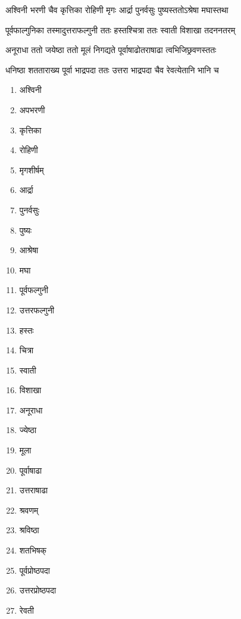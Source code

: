 \label{app:nakshatra_names}

\twolineshloka
{अश्विनी भरणी चैव कृत्तिका रोहिणी मृगः}
{आर्द्रा पुनर्वसुः पुष्यस्ततोऽश्रेषा मघास्तथा}

\twolineshloka
{पूर्वफाल्गुनिका तस्मादुत्तराफल्गुनी ततः}
{हस्तश्चित्रा ततः स्वाती विशाखा तदननतरम्}

\twolineshloka
{अनूराधा ततो जयेष्ठा ततो मूलं निगद्यते}
{पूर्वाषाढोतराषाढा त्वभिजिछ्रवणस्ततः}

\twolineshloka
{धनिष्ठा शतताराख्य पूर्वा भाद्रपदा ततः}
{उत्तरा भाद्रपदा चैव रेवत्येतानि भानि च}


\begin{multicols}{2}
\begin{enumerate}
\item अश्विनी
\item अपभरणी
\item कृत्तिका
\item रोहिणी
\item मृगशीर्षम्
\item आर्द्रा
\item पुनर्वसुः
\item पुष्यः
\item आश्रेषा
\item मघा
\item पूर्वफल्गुनी
\item उत्तरफल्गुनी
\item हस्तः
\item चित्रा
\item स्वाती
\item विशाखा
\item अनूराधा
\item ज्येष्ठा
\item मूला
\item पूर्वाषाढा
\item उत्तराषाढा
\item श्रवणम्
\item श्रविष्ठा
\item शतभिषक्
\item पूर्वप्रोष्ठपदा
\item उत्तरप्रोष्ठपदा
\item रेवती
\end{enumerate}
\end{multicols}